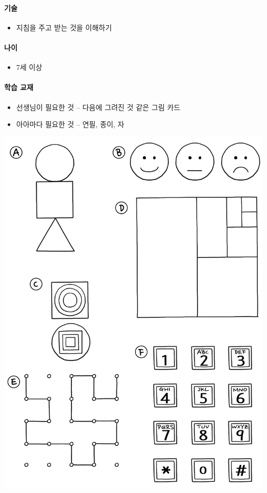 \documentclass[]{article}
\begin{document}
\mbox{}\paragraph{기술}\label{section-174}

\begin{itemize}
\itemsep1pt\parskip0pt
\item
  지침을 주고 받는 것을 이해하기
\end{itemize}

\mbox{}\paragraph{나이}\label{section-175}

\begin{itemize}
\itemsep1pt\parskip0pt
\item
  7세 이상
\end{itemize}

\mbox{}\paragraph{학습 교재}\label{section-176}

\begin{itemize}
\itemsep1pt\parskip0pt
\item
  선생님이 필요한 것 -- 다음에 그려진 것 같은 그림 카드
\item
  아아마다 필요한 것 -- 연필, 종이, 자
\end{itemize}

\includegraphics{csunplugged/03-part/img/ch13-language/12-language-01-picture.png}
\end{document}
